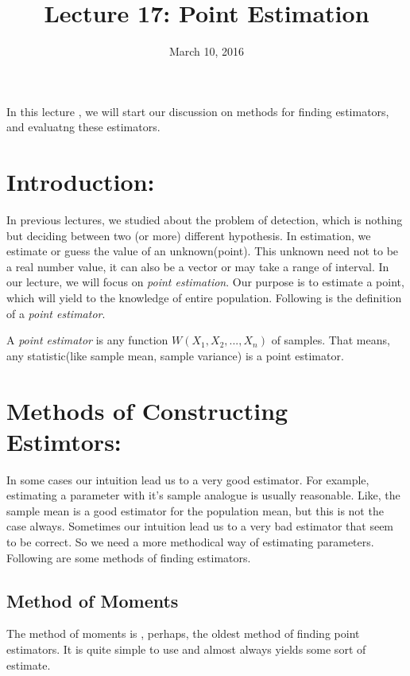 \documentclass[a4paper,english,12pt]{article}
\title{Lecture 17: Point Estimation}
\date{March 10, 2016}
\author{}
\begin{document}
\maketitle
\maketitle
In this lecture , we will start our discussion on methods for finding estimators, and evaluatng these estimators.
\section{Introduction:}
In previous lectures, we studied about the problem of detection, which is nothing but deciding between two (or more) different hypothesis. In estimation, we estimate or guess the value of an unknown(point). This unknown need not to be a real number value, it can also be a vector or may take a range of interval. In our lecture, we will focus on \textit{point estimation}. Our purpose is to estimate a point, which will yield to the knowledge of entire population. Following is the definition of a \textit{point estimator}.\\

\begin{defn}{ A \textit{point estimator} is any function $W(X_1,X_2,...,X_n)$ of samples. That means, any statistic(like sample mean, sample variance) is a point estimator.}
\end{defn}

\section{Methods of Constructing Estimtors: }
In some cases our intuition lead us to a very good estimator. For example, estimating a parameter with it's sample analogue is usually reasonable. Like, the sample mean is a good estimator for the population mean, but this is not the case always. Sometimes our intuition lead us to a very bad estimator that seem to be correct. So we need a more methodical way of estimating parameters. Following are some methods of finding estimators.

\subsection{Method of Moments}
The method of moments is , perhaps, the oldest method of finding point estimators. It is quite simple to use and almost always yields some sort of estimate.
\end{document}
